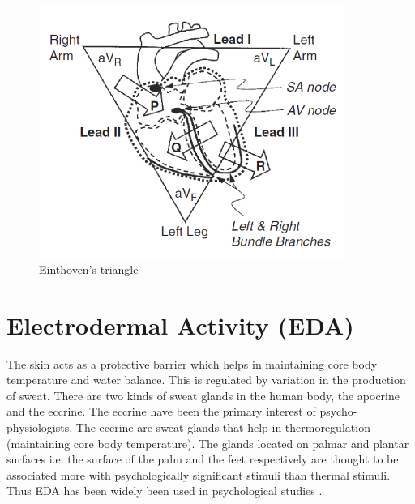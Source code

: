 \begin{figure}
    \centering
    \includegraphics[width=100mm]{Figures/einthoven_triangle.jpg}
    \caption{Einthoven's triangle \cite{cacioppo_cardiovascular_2016_p_183_216}}
    \label{fig:einthoven_triangle}
\end{figure}

\section{Electrodermal Activity (EDA)}
The skin acts as a protective barrier which helps in maintaining core body temperature and water balance. This is regulated by variation in the production of sweat. There are two kinds of sweat glands in the human body, the apocrine and the eccrine. The eccrine have been the primary interest of psycho-physiologists. The eccrine are sweat glands that help in thermoregulation (maintaining core body temperature). The glands located on palmar and plantar surfaces i.e. the surface of the palm and the feet respectively are thought to be associated more with psychologically significant stimuli than thermal stimuli. Thus EDA has been widely been used in psychological studies \cite{cacioppo_electrodermal_2016_p_217_243}.

